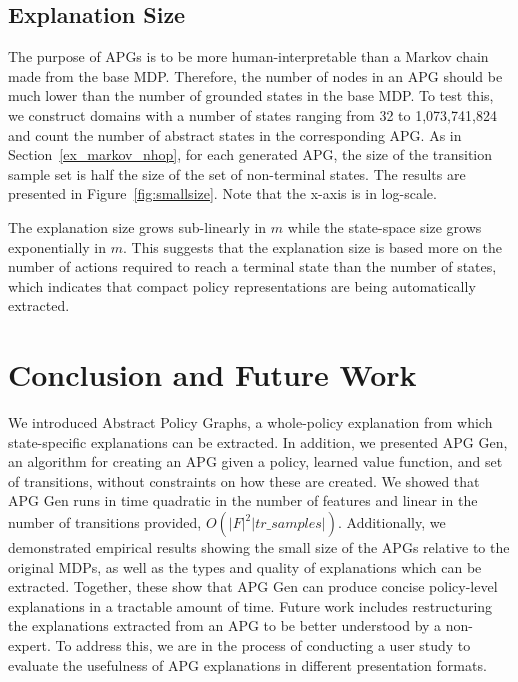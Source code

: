 \documentclass[letterpaper]{article} %
\begin{document}
\subsection{Explanation Size}
The purpose of APGs is to be more human-interpretable than a Markov chain made from the base MDP.
Therefore, the number of nodes in an APG should be much lower than the number of grounded states in the base MDP.
To test this, we construct domains with a number of states ranging from 32 to 1,073,741,824 and count the number of abstract states in the corresponding APG.
As in Section~\ref{ex_markov_nhop}, for each generated APG, the size of the transition sample set is half the size of the set of non-terminal states.
The results are presented in Figure~\ref{fig:smallsize}.
Note that the x-axis is in log-scale.

The explanation size grows sub-linearly in $m$ while the state-space size grows exponentially in $m$.
This suggests that the explanation size is based more on the number of actions required to reach a terminal state than the number of states, which indicates that compact policy representations are being automatically extracted.

\section{Conclusion and Future Work}
We introduced Abstract Policy Graphs, a whole-policy explanation from which state-specific explanations can be extracted. In addition, we presented APG Gen, an algorithm for creating an APG given a policy, learned value function, and set of transitions, without constraints on how these are created. We showed that APG Gen runs in time quadratic in the number of features and linear in the number of transitions provided, $O(|F|^2 |tr\_samples|)$. Additionally, we demonstrated empirical results showing the small size of the APGs relative to the original MDPs, as well as the types and quality of explanations which can be extracted. Together, these show that APG Gen can produce concise policy-level explanations in a tractable amount of time.
Future work includes restructuring the explanations extracted from an APG to be better understood by a non-expert.
To address this, we are in the process of conducting a user study to evaluate the usefulness of APG explanations in different presentation formats.
\end{document}
